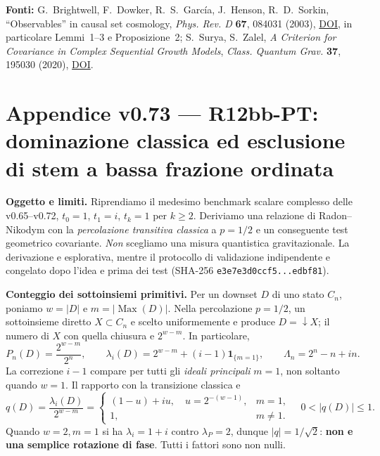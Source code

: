 \documentclass[11pt,a4paper]{article}
\begin{document}
\textbf{Fonti:} G.~Brightwell, F.~Dowker, R.~S.~Garc\'ia, J.~Henson, R.~D.~Sorkin, ``Observables'' in causal set cosmology, \emph{Phys. Rev. D} \textbf{67}, 084031 (2003), \href{https://doi.org/10.1103/PhysRevD.67.084031}{DOI}, in particolare Lemmi~1--3 e Proposizione~2; S.~Surya, S.~Zalel, \emph{A Criterion for Covariance in Complex Sequential Growth Models}, \emph{Class. Quantum Grav.} \textbf{37}, 195030 (2020), \href{https://doi.org/10.1088/1361-6382/ab987f}{DOI}.


\clearpage
\section*{Appendice v0.73 --- R12bb-PT: dominazione classica ed esclusione di stem a bassa frazione ordinata}
\textbf{Oggetto e limiti.} Riprendiamo il medesimo benchmark scalare complesso delle v0.65--v0.72, $t_0=1$, $t_1=i$, $t_k=1$ per $k\ge2$. Deriviamo una relazione di Radon--Nikodym con la \emph{percolazione transitiva classica} a $p=1/2$ e un conseguente test geometrico covariante. \emph{Non} scegliamo una misura quantistica gravitazionale. La derivazione e esplorativa, mentre il protocollo di validazione indipendente e congelato dopo l'idea e prima dei test (SHA-256 \texttt{e3e7e3d0ccf5...edbf81}).

\textbf{Conteggio dei sottoinsiemi primitivi.} Per un downset $D$ di uno stato $C_n$, poniamo $w=|D|$ e $m=|\operatorname{Max}(D)|$. Nella percolazione $p=1/2$, un sottoinsieme diretto $X\subset C_n$ e scelto uniformemente e produce $D=\downarrow X$; il numero di $X$ con quella chiusura e $2^{w-m}$. In particolare,
\begin{equation}
P_n(D)=\frac{2^{w-m}}{2^n},\qquad
\lambda_i(D)=2^{w-m}+(i-1)\mathbf{1}_{\{m=1\}},\qquad
\Lambda_n=2^n-n+in.
\tag{PT.1}
\end{equation}
La correzione $i-1$ compare per tutti gli \emph{ideali principali} $m=1$, non soltanto quando $w=1$. Il rapporto con la transizione classica e
\begin{equation}
q(D)=\frac{\lambda_i(D)}{2^{w-m}}=\begin{cases}
(1-u)+iu,\quad u=2^{-(w-1)},&m=1,\\
1,&m\ne1.
\end{cases}\quad 0<|q(D)|\le1.
\tag{PT.2}
\end{equation}
Quando $w=2,m=1$ si ha $\lambda_i=1+i$ contro $\lambda_P=2$, dunque $|q|=1/\sqrt2$: \textbf{non e una semplice rotazione di fase}. Tutti i fattori sono non nulli.
\end{document}

